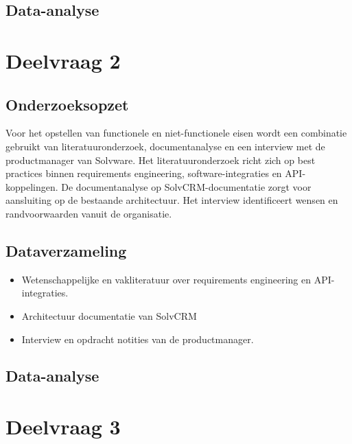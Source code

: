 \subsection{Data-analyse}


\section{Deelvraag 2}

\subsection{Onderzoeksopzet}
Voor het opstellen van functionele en niet-functionele eisen wordt een combinatie gebruikt van literatuuronderzoek, documentanalyse en een interview met de productmanager van Solvware.
Het literatuuronderzoek richt zich op best practices binnen requirements engineering, software-integraties en API-koppelingen.
De documentanalyse op SolvCRM-documentatie
zorgt voor aansluiting op de bestaande architectuur.
Het interview identificeert wensen en randvoorwaarden vanuit de organisatie.

\subsection{Dataverzameling}
\begin{itemize}
    \item Wetenschappelijke en vakliteratuur over requirements engineering en API-integraties.
    \item Architectuur documentatie van SolvCRM
    \item Interview en opdracht notities van de productmanager.
\end{itemize}

\subsection{Data-analyse}


\section{Deelvraag 3}

